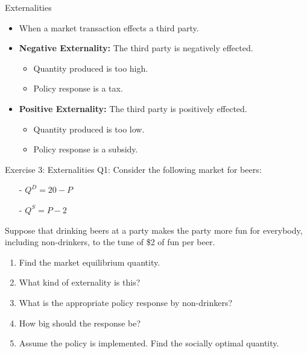 \documentclass[9pt, handout]{beamer}
\begin{document}
\begin{frame}{Externalities}
    \begin{itemize}
        \item When a market transaction effects a third party.
        \vspace{5pt}
        \item \textbf{Negative Externality:} The third party is negatively effected.
        \vspace{3pt}
        \begin{itemize}
            \item Quantity produced is too high.
            \item Policy response is a tax.
        \end{itemize}
        \vspace{5pt}
        \item \textbf{Positive Externality:} The third party is positively effected.
        \vspace{3pt}
        \begin{itemize}
            \item Quantity produced is too low.
            \item Policy response is a subsidy.
        \end{itemize}
    \end{itemize}
\end{frame}

\begin{frame}{Exercise 3: Externalities}
    Q1: Consider the following market for beers:
    \begin{itemize}
        \item[-] $Q^D = 20 - P$
        \item[-] $Q^S = P - 2$
    \end{itemize}
    Suppose that drinking beers at a party makes the party more fun for everybody, including non-drinkers, to the tune of \$2 of fun per beer.
    \vspace{5pt}
    \begin{enumerate}
        \item Find the market equilibrium quantity.
        \item What kind of externality is this?
        \item What is the appropriate policy response by non-drinkers?
        \item How big should the response be? 
        \item Assume the policy is implemented. Find the socially optimal quantity.
    \end{enumerate}
    \vspace{1in}
\end{frame}
\end{document}

